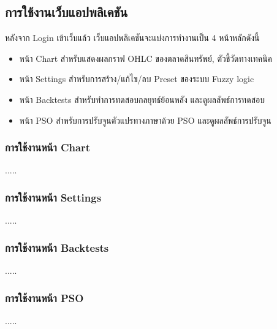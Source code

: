 \subsection{การใช้งานเว็บแอปพลิเคชัน}
หลังจาก Login เข้าเว็บแล้ว เว็บแอปพลิเคชันจะแบ่งการทำงานเป็น 4 หน้าหลักดังนี้
\begin{itemize}
    \item หน้า Chart สำหรับแสดงผลกราฟ OHLC ของตลาดสินทรัพย์, ตัวชี้วัดทางเทคนิค
    \item หน้า Settings สำหรับการสร้าง/แก้ไข/ลบ Preset ของระบบ Fuzzy logic
    \item หน้า Backtests สำหรับทำการทดสอบกลยุทธ์ย้อนหลัง และดูผลลัพธ์การทดสอบ
    \item หน้า PSO สำหรับการปรับจูนตัวแปรทางภาษาด้วย PSO และดูผลลัพธ์การปรับจูน
\end{itemize}

\subsubsection{การใช้งานหน้า Chart}
.....

\subsubsection{การใช้งานหน้า Settings}
.....

\subsubsection{การใช้งานหน้า Backtests}
.....

\subsubsection{การใช้งานหน้า PSO}
.....
